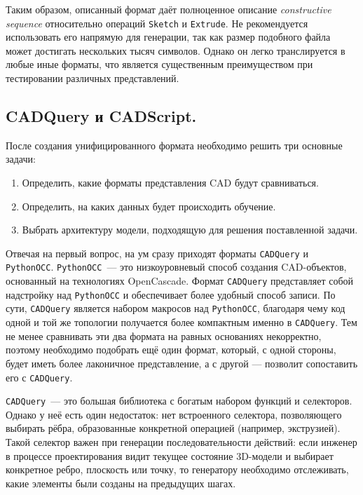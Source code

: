 Таким образом, описанный формат даёт полноценное описание \textit{constructive sequence}
относительно операций \texttt{Sketch} и \texttt{Extrude}. Не рекомендуется использовать его напрямую для генерации,
так как размер подобного файла может достигать нескольких тысяч символов.
Однако он легко транслируется в любые иные форматы, что является существенным преимуществом при тестировании различных представлений.

\subsection{CADQuery и CADScript.}

После создания унифицированного формата необходимо решить три основные задачи:
\begin{enumerate}
    \item Определить, какие форматы представления CAD будут сравниваться.
    \item Определить, на каких данных будет происходить обучение.
    \item Выбрать архитектуру модели, подходящую для решения поставленной задачи.
\end{enumerate}

Отвечая на первый вопрос, на ум сразу приходят форматы \texttt{CADQuery} и \texttt{PythonOCC}.
\texttt{PythonOCC}~— это низкоуровневый способ создания CAD-объектов, основанный на технологиях OpenCascade.
Формат \texttt{CADQuery} представляет собой надстройку над \texttt{PythonOCC} и обеспечивает более удобный
способ записи. По сути, \texttt{CADQuery} является набором макросов над \texttt{PythonOCC}, благодаря чему
код одной и той же топологии получается более компактным именно в \texttt{CADQuery}. Тем не менее
сравнивать эти два формата на равных основаниях некорректно, поэтому необходимо подобрать ещё один формат,
который, с одной стороны, будет иметь более лаконичное представление, а с другой --- позволит сопоставить его
с \texttt{CADQuery}.

\texttt{CADQuery}~— это большая библиотека с богатым набором функций и селекторов. Однако у неё есть
один недостаток: нет встроенного селектора, позволяющего выбирать рёбра, образованные конкретной
операцией (например, экструзией). Такой селектор важен при генерации последовательности действий:
если инженер в процессе проектирования видит текущее состояние 3D-модели и выбирает конкретное
ребро, плоскость или точку, то генератору необходимо отслеживать, какие элементы были созданы на предыдущих шагах.

